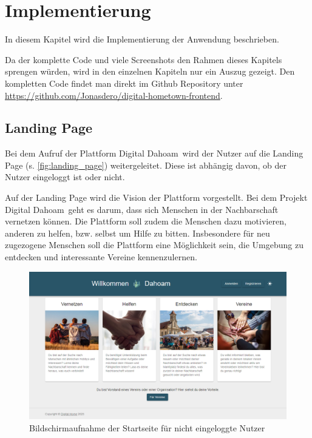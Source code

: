 \chapter{Implementierung}
\label{ch:implementation}

In diesem Kapitel wird die Implementierung der Anwendung beschrieben.

Da der komplette Code und viele Screenshots den Rahmen dieses Kapitels sprengen würden, wird in den einzelnen Kapiteln nur ein Auszug gezeigt.
Den kompletten Code findet man direkt im Github Repository unter \url{https://github.com/Jonasdero/digital-hometown-frontend}.

 \section{Landing Page}
 \label{sec:landing_page}
 
Bei dem Aufruf der Plattform \glqq Digital Dahoam\grqq \ wird der Nutzer auf die Landing Page (s. \autoref{fig:landing_page}) weitergeleitet. Diese ist abhängig davon, ob der Nutzer eingeloggt ist oder nicht.

Auf der Landing Page wird die Vision der Plattform vorgestellt. Bei dem Projekt \glqq Digital Dahoam\grqq \ geht es darum, dass sich Menschen in der Nachbarschaft vernetzen können. Die Plattform soll zudem die Menschen dazu motivieren, anderen zu helfen, bzw. selbst um Hilfe zu bitten. Insbesondere für neu zugezogene Menschen soll die Plattform eine Möglichkeit sein, die Umgebung zu entdecken und interessante Vereine kennenzulernen.

\begin{figure}[!htb]
  \centering
  \includegraphics[width=.9\textwidth]{figures/boas/21_landing_page.png}
  \caption[]{Bildschirmaufnahme der Startseite für nicht eingeloggte Nutzer}
  \label{fig:landing_page}
\end{figure}

